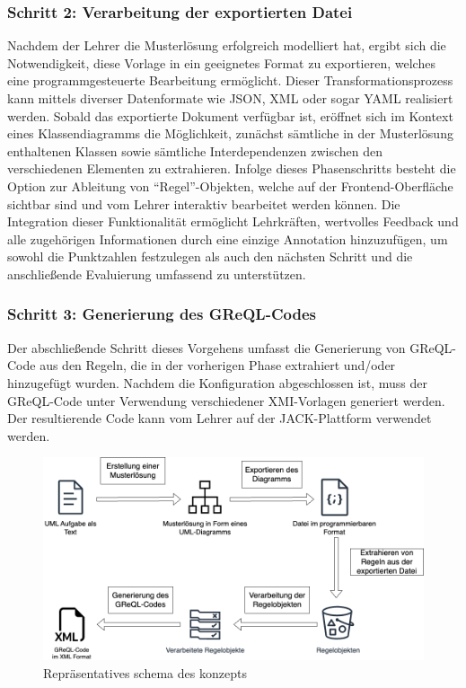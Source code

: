 \subsubsection{Schritt 2: Verarbeitung der exportierten Datei}

Nachdem der Lehrer die Musterlösung erfolgreich modelliert hat, ergibt sich die Notwendigkeit, diese Vorlage in ein geeignetes Format zu exportieren, welches eine programmgesteuerte Bearbeitung ermöglicht. Dieser Transformationsprozess kann mittels diverser Datenformate wie JSON, XML oder sogar YAML realisiert werden. Sobald das exportierte Dokument verfügbar ist, eröffnet sich im Kontext eines Klassendiagramms die Möglichkeit, zunächst sämtliche in der Musterlösung enthaltenen Klassen sowie sämtliche Interdependenzen zwischen den verschiedenen Elementen zu extrahieren. Infolge dieses Phasenschritts besteht die Option zur Ableitung von ``Regel''-Objekten, welche auf der Frontend-Oberfläche sichtbar sind und vom Lehrer interaktiv bearbeitet werden können. Die Integration dieser Funktionalität ermöglicht Lehrkräften, wertvolles Feedback und alle zugehörigen Informationen durch eine einzige Annotation hinzuzufügen, um sowohl die Punktzahlen festzulegen als auch den nächsten Schritt und die anschließende Evaluierung umfassend zu unterstützen.

\subsubsection{Schritt 3: Generierung des GReQL-Codes}

Der abschließende Schritt dieses Vorgehens umfasst die Generierung von GReQL-Code aus den Regeln, die in der vorherigen Phase extrahiert und/oder hinzugefügt wurden. Nachdem die Konfiguration abgeschlossen ist, muss der GReQL-Code unter Verwendung verschiedener XMI-Vorlagen generiert werden. Der resultierende Code kann vom Lehrer auf der JACK-Plattform verwendet werden.

\begin{figure}
	\centering
	\includegraphics[width=15cm]{images/concept}
	\caption{Repräsentatives schema des konzepts}
	\label{fig:concept}
\end{figure}

